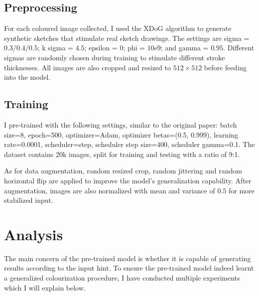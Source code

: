 \subsection{Preprocessing}
For each coloured image collected, I used the XDoG\cite{winnemollerXDoGEXtendedDifferenceofGaussians2012} algorithm to generate synthetic sketches that stimulate real sketch drawings. The settings are sigma = $0.3/0.4/0.5$; k sigma = $4.5$; epsilon = $0$; phi = $10\mathrm{e}9$; and gamma = $0.95$. Different sigmas are randomly chosen during training to stimulate different stroke thicknesses. All images are also cropped and resized to $512\times512$ before feeding into the model.

\subsection{Training}
I pre-trained with the following settings, similar to the original paper: batch size=8, epoch=500, optimizer=Adam, optimizer betas=(0.5, 0.999), learning rate=0.0001, scheduler=step, scheduler step size=400, scheduler gamma=0.1. The dataset contains 20k images, split for training and testing with a ratio of 9:1.

As for data augmentation, random resized crop, random jittering and random horizontal flip are applied to improve the model's generalization capability. After augmentation, images are also normalized with mean and variance of $0.5$ for more stabilized input.

\section{Analysis}
The main concern of the pre-trained model is whether it is capable of generating results according to the input hint. To ensure the pre-trained model indeed learnt a generalized colourization procedure, I have conducted multiple experiments which I will explain below.

